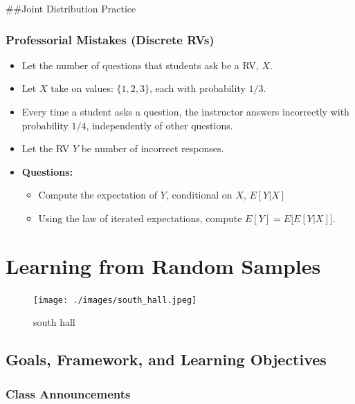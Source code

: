 \documentclass[
]{book}
\providecommand{\tightlist}{%
  \setlength{\itemsep}{0pt}\setlength{\parskip}{0pt}}
\theoremstyle{definition}
\theoremstyle{definition}
\theoremstyle{definition}
\theoremstyle{definition}
\theoremstyle{remark}
\begin{document}
\#\#Joint Distribution Practice

\hypertarget{professorial-mistakes-discrete-rvs}{%
\subsection{Professorial Mistakes (Discrete RVs)}\label{professorial-mistakes-discrete-rvs}}

\begin{itemize}
\item
  Let the number of questions that students ask be a RV, \(X\).\\
\item
  Let \(X\) take on values: \(\{1, 2, 3\}\), each with probability \(1/3\).\\
\item
  Every time a student asks a question, the instructor answers incorrectly with probability \(1/4\), independently of other questions.
\item
  Let the RV \(Y\) be number of incorrect responses.
\item
  \textbf{Questions:}

  \begin{itemize}
  \tightlist
  \item
    Compute the expectation of \(Y\), conditional on \(X\), \(E[Y|X]\)
  \item
    Using the law of iterated expectations, compute \(E[Y] = E\big[E[Y|X]\big]\).
  \end{itemize}
\end{itemize}

\hypertarget{learning-from-random-samples}{%
\chapter{Learning from Random Samples}\label{learning-from-random-samples}}

\begin{figure}
\centering
\texttt{[image: ./images/south\_hall.jpeg]}
\caption{south hall}
\end{figure}

\hypertarget{goals-framework-and-learning-objectives}{%
\section{Goals, Framework, and Learning Objectives}\label{goals-framework-and-learning-objectives}}

\hypertarget{class-announcements-3}{%
\subsection{Class Announcements}\label{class-announcements-3}}
\end{document}
